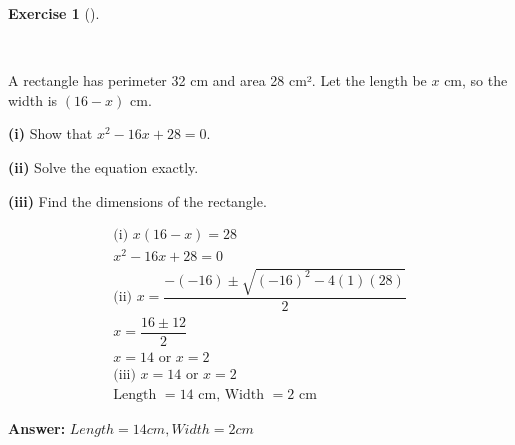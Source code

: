 \documentclass[
  letterpaper,
  DIV=11,
  numbers=noendperiod]{scrreprt}
\theoremstyle{definition}
\newtheorem{exercise}{Exercise}[chapter]
\theoremstyle{remark}
\begin{document}
\begin{exercise}[]\protect\hypertarget{exr-u6-21-1}{}\label{exr-u6-21-1}

~

A rectangle has perimeter 32 cm and area 28 cm². Let the length be \(x\)
cm, so the width is \((16 - x)\) cm.

\textbf{(i)} Show that \(x^2 - 16x + 28 = 0\).

\textbf{(ii)} Solve the equation exactly.

\textbf{(iii)} Find the dimensions of the rectangle.

\begin{tcolorbox}[enhanced jigsaw, opacitybacktitle=0.6, coltitle=black, arc=.35mm, colframe=quarto-callout-tip-color-frame, colback=white, bottomrule=.15mm, left=2mm, colbacktitle=quarto-callout-tip-color!10!white, titlerule=0mm, opacityback=0, title=\textcolor{quarto-callout-tip-color}{\faLightbulb}\hspace{0.5em}{🔍 View Solution}, leftrule=.75mm, breakable, rightrule=.15mm, bottomtitle=1mm, toptitle=1mm, toprule=.15mm]

\begin{align*}
\text{(i) } x(16 - x) = 28 \\ x^2 - 16x + 28 = 0 \\ \text{(ii) } x = \dfrac{-(-16) \pm \sqrt{(-16)^2 - 4(1)(28)}}{2} \\ x = \dfrac{16 \pm 12}{2} \\ x = 14 \text{ or } x = 2 \\ \text{(iii) } x = 14 \text{ or } x = 2 \\ \text{Length } = 14 \text{ cm, Width } = 2 \text{ cm}
\end{align*}

\textbf{Answer:} \(Length = 14 cm, Width = 2 cm\)

\end{tcolorbox}

\end{exercise}
\end{document}
